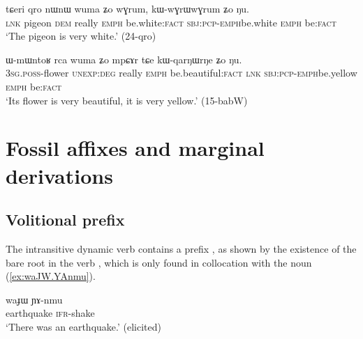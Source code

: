 \begin{exe}
\ex \label{ex:kWwGrWwGrum}
\gll  tɕeri qro nɯnɯ wuma ʑo wɣrum, kɯ-wɣrɯ\redp{}wɣrum ʑo ŋu. \\
\textsc{lnk} pigeon \textsc{dem} really \textsc{emph} be.white:\textsc{fact} \textsc{sbj}:\textsc{pcp}-\textsc{emph}\redp{}be.white \textsc{emph} be:\textsc{fact} \\
\glt `The pigeon is very white.' (24-qro) 
\end {exe}

\begin{exe}
\ex \label{ex:kWqarNWrNe}
\gll ɯ-mɯntoʁ rca wuma ʑo mpɕɤr tɕe kɯ-qarŋɯ\redp{}rŋe ʑo ŋu. \\
\textsc{3sg}.\textsc{poss}-flower \textsc{unexp}:\textsc{deg} really \textsc{emph} be.beautiful:\textsc{fact} \textsc{lnk} \textsc{sbj}:\textsc{pcp}-\textsc{emph}\redp{}be.yellow \textsc{emph} be:\textsc{fact} \\
\glt `Its flower is very beautiful, it is very yellow.' (15-babW) 
\end {exe}

\section{Fossil affixes and marginal derivations} \label{sec:marginal.derivations}


\subsection{Volitional  prefix} \label{sec:volitional.mW}
The intransitive dynamic verb  contains a prefix , as shown by the existence of the bare root  in the verb  \citep{jacques17volitional}, which is only found in collocation with the noun  (\ref{ex:waJW.YAnmu}).


\begin{exe}
\ex \label{ex:waJW.YAnmu}
\gll waɟɯ ɲɤ-nmu \\
earthquake \textsc{ifr}-shake \\
\glt `There was an earthquake.' (elicited)
\end{exe}

